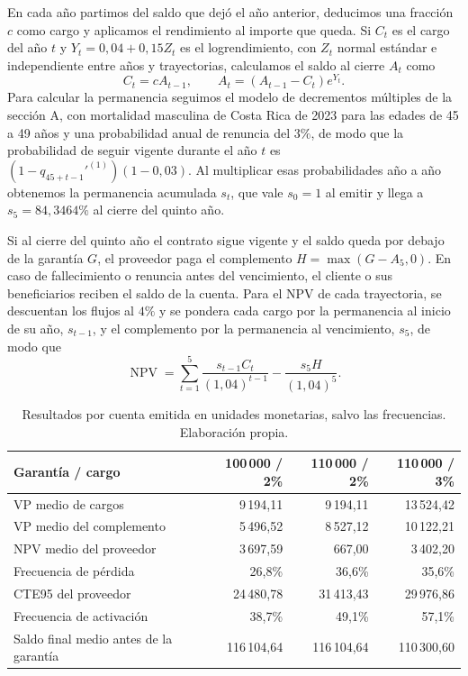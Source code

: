 \documentclass[11pt]{article}
\begin{document}
En cada año partimos del saldo que dejó el año anterior, deducimos una fracción $c$ como cargo y aplicamos el rendimiento al importe que queda. Si $C_t$ es el cargo del año $t$ y $Y_t=0{,}04+0{,}15Z_t$ es el logrendimiento, con $Z_t$ normal estándar e independiente entre años y trayectorias, calculamos el saldo al cierre $A_t$ como
\[
    C_t=cA_{t-1},
    \qquad
    A_t=(A_{t-1}-C_t)e^{Y_t}.
\]
Para calcular la permanencia seguimos el modelo de decrementos múltiples de la sección A, con mortalidad masculina de Costa Rica de 2023 para las edades de 45 a 49 años y una probabilidad anual de renuncia del $3\%$, de modo que la probabilidad de seguir vigente durante el año $t$ es $(1-q_{45+t-1}'^{(1)})(1-0{,}03)$. Al multiplicar esas probabilidades año a año obtenemos la permanencia acumulada $s_t$, que vale $s_0=1$ al emitir y llega a $s_5=84{,}3464\%$ al cierre del quinto año.

Si al cierre del quinto año el contrato sigue vigente y el saldo queda por debajo de la garantía $G$, el proveedor paga el complemento $H=\max(G-A_5,0)$. En caso de fallecimiento o renuncia antes del vencimiento, el cliente o sus beneficiarios reciben el saldo de la cuenta. Para el NPV de cada trayectoria, se descuentan los flujos al $4\%$ y se pondera cada cargo por la permanencia al inicio de su año, $s_{t-1}$, y el complemento por la permanencia al vencimiento, $s_5$, de modo que
\[
    \operatorname{NPV}
    = \sum_{t=1}^{5}\frac{s_{t-1}C_t}{(1{,}04)^{t-1}}
    - \frac{s_5H}{(1{,}04)^5}.
\]

\begin{table}[htbp]
\centering
\small
\begin{tabular}{@{}lrrr@{}}
\toprule
Garantía / cargo & 100\,000 / 2\% & 110\,000 / 2\% & 110\,000 / 3\% \\
\midrule
VP medio de cargos & 9\,194,11 & 9\,194,11 & 13\,524,42 \\
VP medio del complemento & 5\,496,52 & 8\,527,12 & 10\,122,21 \\
NPV medio del proveedor & 3\,697,59 & 667,00 & 3\,402,20 \\
Frecuencia de pérdida & 26,8\% & 36,6\% & 35,6\% \\
CTE95 del proveedor & 24\,480,78 & 31\,413,43 & 29\,976,86 \\
Frecuencia de activación & 38,7\% & 49,1\% & 57,1\% \\
Saldo final medio antes de la garantía & 116\,104,64 & 116\,104,64 & 110\,300,60 \\
\bottomrule
\end{tabular}
\caption{Resultados por cuenta emitida en unidades monetarias, salvo las frecuencias. Elaboración propia.}
\label{tab:equity-comparacion}
\end{table}
\end{document}
